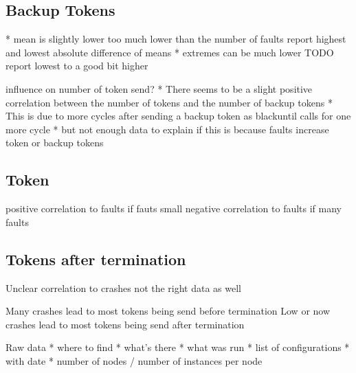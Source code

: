 \subsection{Backup Tokens}

* mean is slightly lower too much lower than the number of faults report highest and lowest absolute difference of means
* extremes can be much lower TODO report lowest to a good bit higher

influence on number of token send?
* There seems to be a slight positive correlation between the number of tokens and the number of backup tokens 
* This is due to more cycles after sending a backup token as blackuntil calls for one more cycle
* but not enough data to explain if this is because faults increase token or backup tokens 


\subsection{Token}

positive correlation to faults if fauts small
negative correlation to faults if many faults


\subsection{Tokens after termination}
Unclear correlation to crashes not the right data as well

Many crashes lead to most tokens being send before termination
Low or now crashes lead to most tokens being send after termination



Raw data 
* where to find
* what's there
* what was run
* list of configurations
* with date
* number of nodes / number of instances per node


